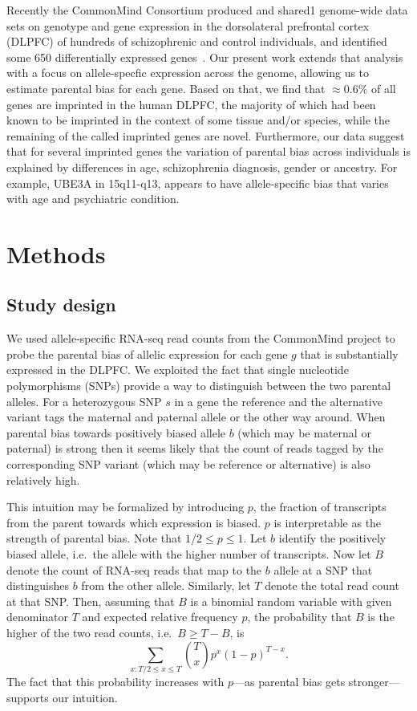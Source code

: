 \documentclass[letterpaper]{article}
\begin{document}
Recently the CommonMind Consortium produced and shared1 genome-wide data sets
on genotype and gene expression in the dorsolateral prefrontal cortex (DLPFC)
of hundreds of schizophrenic and control individuals, and identified some 650
differentially expressed genes~\cite{Fromer2016a}. Our present work extends
that analysis with a focus on allele-specfic expression across the genome,
allowing us to estimate parental bias for each gene.  Based on that, we find
that \(\approx 0.6\%\) of all genes are imprinted in the human DLPFC, the
majority of which had been known to be imprinted in the context of some tissue
and/or species, while the remaining of the called imprinted genes are novel.
Furthermore, our data suggest that for several imprinted genes the variation of
parental bias across individuals is explained by differences in age,
schizophrenia diagnosis, gender or ancestry.  For example, UBE3A in
15q11-q13, appears to have allele-specific bias that varies with age and
psychiatric condition.

\section{Methods}

\subsection{Study design}

We used allele-specific RNA-seq read counts from the CommonMind project to
probe the parental bias of allelic expression for each gene \(g\) that is
substantially expressed in the DLPFC.  We exploited the fact that single
nucleotide polymorphisms (SNPs) provide a way to distinguish between the two
parental alleles.  For a heterozygous SNP \(s\) in a gene the reference and the
alternative variant tags the maternal and paternal allele or the other way
around.  When parental bias towards positively biased allele \(b\) (which may
be maternal or paternal) is strong then it seems likely that the count of
reads tagged by the corresponding SNP variant (which may be reference or
alternative) is also relatively high.

This intuition may be formalized by introducing \(p\), the fraction of
transcripts from the parent towards which expression is biased.  \(p\) is
interpretable as the strength of parental bias.  Note that \(1/2\le p\le 1\).
Let \(b\) identify the positively biased allele, i.e.~the allele with the
higher number of transcripts.  Now let \(B\) denote the count of RNA-seq reads
that map to the \(b\) allele at a SNP that distinguishes \(b\) from the other
allele.  Similarly, let \(T\) denote the total read count at that SNP.  Then,
assuming that \(B\) is a binomial random variable with given denominator \(T\)
and expected relative frequency \(p\), the probability that \(B\) is the
higher of the two read counts, i.e.~\(B \ge T - B\), is \[\sum_{x:T/2\le x\le
T} {T \choose x} p^x (1 - p)^{T-x}.\] The fact that this probability increases
with \(p\)---as parental bias gets stronger---supports our intuition.
\end{document}
